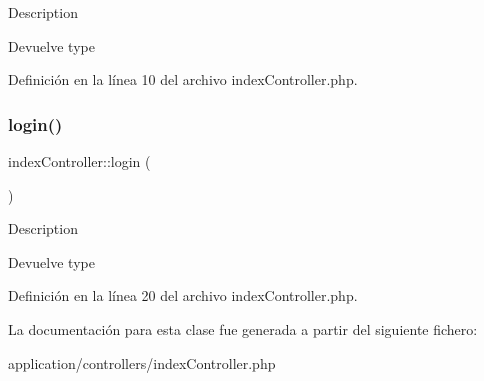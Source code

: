 Description \begin{DoxyReturn}{Devuelve}
type 
\end{DoxyReturn}


Definición en la línea 10 del archivo index\+Controller.\+php.

\mbox{\label{classindex_controller_ad14fd2e2267073c8d3e13eb6ff7f7379}} 
\subsubsection{\texorpdfstring{login()}{login()}}
{\footnotesize\ttfamily index\+Controller\+::login (\begin{DoxyParamCaption}{ }\end{DoxyParamCaption})}

Description \begin{DoxyReturn}{Devuelve}
type 
\end{DoxyReturn}


Definición en la línea 20 del archivo index\+Controller.\+php.



La documentación para esta clase fue generada a partir del siguiente fichero\+:\begin{DoxyCompactItemize}
\item 
application/controllers/index\+Controller.\+php\end{DoxyCompactItemize}
